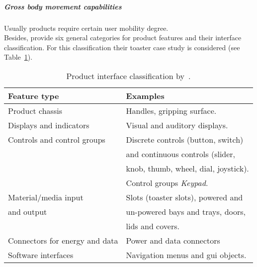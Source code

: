 \subparagraph*{Gross body movement capabilities}
Usually products require certain user mobility degree. 
\\
Besides, \citeauthor{persad_characterising_2007} provide six general categories 
for product features and their interface classification. For this classification 
their toaster case study is considered (see Table~\ref{tbl:persad_product_interface}).

\begin{table}
  \caption{Product interface classification by~\citet{persad_characterising_2007}.}
  \label{tbl:persad_product_interface}
\footnotesize
\centering
    \begin{tabular}{l l}
    \hline
    \textbf{Feature type} 	& \textbf{Examples} \\
    \hline
    Product chassis 		& Handles, gripping surface. 		\\
    Displays and indicators 	& Visual and auditory displays. 	\\
    Controls and control groups & Discrete controls (button, switch) 	\\
				& and continuous controls (slider,  	\\
				& knob, thumb, wheel, dial, joystick).	\\
				& Control groups \textit{Keypad}. 	\\
    Material/media input 	& Slots (toaster slots), powered and 	\\
    and output			& un-powered bays and trays, doors, 	\\
				& lids and covers.			\\
    Connectors for energy and data & Power and data connectors 		\\
    Software interfaces 	& Navigation menus and \ac{gui} objects. \\
    \hline
  \end{tabular}
\end{table}

